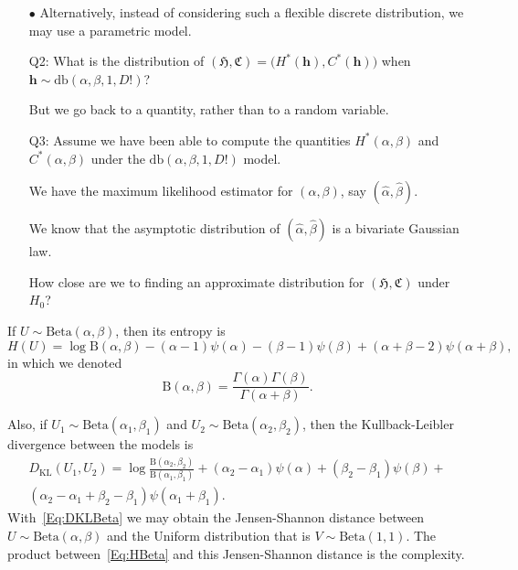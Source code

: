 \documentclass[12pt]{article}
\begin{document}
\begin{itemize}
\item[$\bullet$] Alternatively, instead of considering such a flexible discrete distribution, we may use a parametric model.
\item[Q2:] What is the distribution of $
(\mathfrak{H},\mathfrak{C}) = 
\big(H^*(\bm h),C^*(\bm h)\big)$ when $\bm h\sim\text{db}(\alpha,\beta,1, D!)$?
\item[] But we go back to a quantity, rather than to a random variable.
\item[Q3:] Assume we have been able to compute the quantities $H^*(\alpha,\beta)$ and $C^*(\alpha,\beta)$ under the $\text{db}(\alpha,\beta,1, D!)$ model.
\item[] We have the maximum likelihood estimator for $(\alpha,\beta)$, say $(\widehat\alpha,\widehat\beta)$.
\item[] We know that the asymptotic distribution of $(\widehat\alpha,\widehat\beta)$ is a bivariate Gaussian law.
\item[] How close are we to finding an approximate distribution for $
(\mathfrak{H},\mathfrak{C})$ under $H_0$?
\end{itemize}

If $U\sim\text{Beta}(\alpha,\beta)$, then its entropy is
\begin{equation}
H(U) = \log\text{B}(\alpha,\beta) -
(\alpha-1)\psi(\alpha) -(\beta-1) \psi(\beta) +(\alpha+\beta-2) \psi(\alpha+\beta),
\label{Eq:HBeta}
\end{equation}
in which we denoted
$$
\text{B}(\alpha,\beta) = \frac{\Gamma(\alpha)\Gamma(\beta)}{\Gamma(\alpha+\beta)}.
$$

Also, if $U_1\sim\text{Beta}(\alpha_1,\beta_1)$ and
$U_2\sim\text{Beta}(\alpha_2,\beta_2)$, then the Kullback-Leibler divergence between the models is
\begin{multline}
D_{\text{KL}}(U_1,U_2) = \log\frac{\text{B}(\alpha_2,\beta_2)}{\text{B}(\alpha_1,\beta_1)} +
(\alpha_2-\alpha_1) \psi(\alpha) +
(\beta_2-\beta_1) \psi(\beta) + \\
(\alpha_2-\alpha_1+\beta_2-\beta_1) \psi(\alpha_1+\beta_1).
\label{Eq:DKLBeta}
\end{multline}
With~\eqref{Eq:DKLBeta} we may obtain the Jensen-Shannon distance between $U\sim\text{Beta}(\alpha,\beta)$ and the Uniform distribution that is $V\sim\text{Beta}(1,1)$.
The product between~\eqref{Eq:HBeta} and this Jensen-Shannon distance is the complexity.
\end{document}

